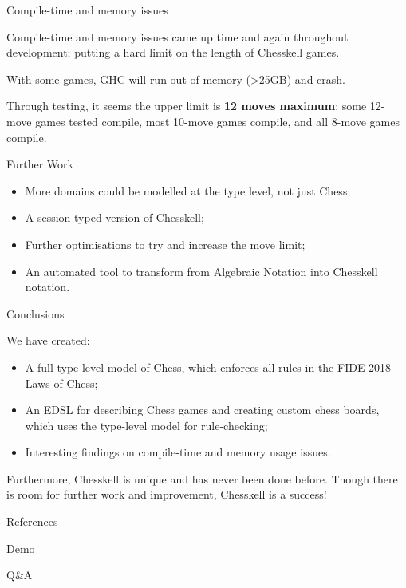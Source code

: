 \documentclass{beamer}
\begin{document}
\begin{frame}{Compile-time and memory issues}

Compile-time and memory issues came up time and again throughout development; putting a hard limit on the length of Chesskell games.

With some games, GHC will run out of memory (\textgreater 25GB) and crash.

Through testing, it seems the upper limit is \textbf{12 moves maximum}; some 12-move games tested compile, most 10-move games compile, and all 8-move games compile.
    
\end{frame}

\begin{frame}{Further Work}

\pause

\begin{itemize}
    \item<2-> More domains could be modelled at the type level, not just Chess;
    \item<3-> A session-typed version of Chesskell;
    \item<4-> Further optimisations to try and increase the move limit;
    \item<5-> An automated tool to transform from Algebraic Notation into Chesskell notation.
\end{itemize}
    
\end{frame}

\begin{frame}{Conclusions}

We have created:

\pause

\begin{itemize}
    \item<2-> A full type-level model of Chess, which enforces all rules in the FIDE 2018 Laws of Chess;
    \item<3-> An EDSL for describing Chess games and creating custom chess boards, which uses the type-level model for rule-checking;
    \item<4-> Interesting findings on compile-time and memory usage issues.
\end{itemize}

\begin{overprint}
Furthermore, Chesskell is unique and has never been done before. Though there is room for further work and improvement, Chesskell is a success!
\end{overprint}

    
\end{frame}

\begin{frame}[allowframebreaks]{References}

\printbibliography
    
\end{frame}

\begin{frame}[standout]

Demo
    
\end{frame}

\begin{frame}[standout]

Q\&A
    
\end{frame}
\end{document}
